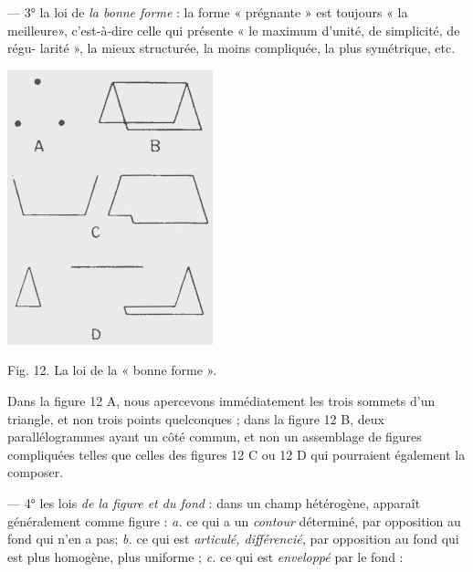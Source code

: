 {— 3° la loi de \textsf{\textit {la bonne forme}} : la forme « prégnante » est toujours « la meilleure»,
c’est-à-dire celle qui présente « le maximum d'unité, de simplicité, de régu-
larité », la mieux structurée, la moins compliquée, la plus symétrique, etc.


\begin{minipage}[c]{.45\linewidth}
\begin{center}
\includegraphics[scale=0.6]{./05_sensible/012}

Fig. 12. La loi de la « bonne forme ».
\end{center}
\end{minipage}
\hfill
\begin{minipage}[c]{.45\linewidth}
Dans la figure 12 A, nous apercevons immédiatement les trois sommets
d’un triangle, et non trois points quelconques ; dans la figure 12 B, deux
parallélogrammes ayant un côté commun, et non un assemblage de figures
compliquées telles que celles des figures 12 C ou 12 D qui pourraient également
la composer.
\end{minipage}


— 4° les lois \textsf{\textit {de la figure et du fond}} : dans un champ
hétérogène, apparaît généralement comme figure : {\it a.} ce qui a un {\it contour}
déterminé, par opposition au fond qui n’en a pas; {\it b.} ce qui est {\it articulé,
différencié,} par opposition au fond qui est plus homogène, plus uniforme ;
{\it c.} ce qui est {\it enveloppé} par le fond : 

}
